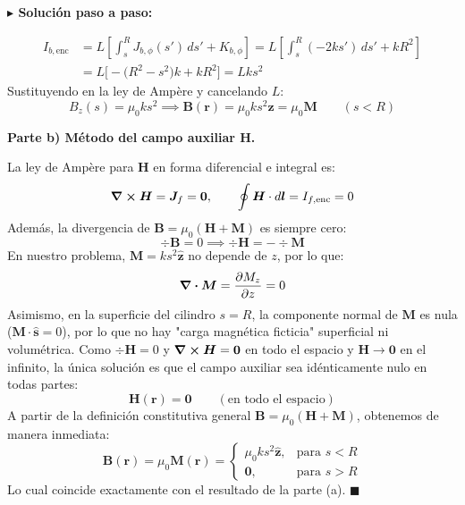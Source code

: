 \documentclass[11pt,a4paper]{book}
\newenvironment{solucion}{%
    \par\medskip\noindent\textbf{\color{blue!65!black}\Large $\blacktriangleright$ Solución paso a paso:}\par\medskip
}{%
    \hfill$\blacksquare$\par\bigskip
}
\newcommand{\shat}{\hat{\bm{s}}}
\newcommand{\zhat}{\hat{\bm{z}}}
\newcommand{\Bvec}{\bm{B}}
\newcommand{\Hvec}{\bm{H}}
\newcommand{\Mvec}{\bm{M}}
\newcommand{\Jvec}{\bm{J}}
\begin{document}
\begin{solucion}
\begin{align}
    I_{b,\text{enc}} &= L \left[ \int_{s}^{R} J_{b,\phi}(s')\,ds' + K_{b,\phi} \right] = L \left[ \int_{s}^{R} (-2k s')\,ds' + k R^2 \right] \nonumber \\
    &= L \Big[ -\big(R^2 - s^2\big)k + k R^2 \Big] = L k s^2
\end{align}
Sustituyendo en la ley de Ampère y cancelando $L$:
\begin{equation}
    B_z(s) = \mu_0 k s^2 \implies \Bvec(\bm{r}) = \mu_0 k s^2 \zhat = \mu_0 \Mvec \qquad (s < R)
\end{equation}

\medskip
\textbf{Parte b) Método del campo auxiliar $\Hvec$.}

La ley de Ampère para $\Hvec$ en forma diferencial e integral es:
\begin{equation}
    \curl{\Hvec} = \Jvec_f = \bm{0}, \qquad \oint \Hvec \cdot d\bm{l} = I_{f,\text{enc}} = 0
\end{equation}
Además, la divergencia de $\Bvec = \mu_0(\Hvec + \Mvec)$ es siempre cero:
\begin{equation}
    \div{\Bvec} = 0 \implies \div{\Hvec} = -\div{\Mvec}
\end{equation}
En nuestro problema, $\Mvec = k s^2 \zhat$ no depende de $z$, por lo que:
\begin{equation}
    \div{\Mvec} = \pdv{M_z}{z} = 0
\end{equation}
Asimismo, en la superficie del cilindro $s = R$, la componente normal de $\Mvec$ es nula ($\Mvec \cdot \shat = 0$), por lo que no hay "carga magnética ficticia" superficial ni volumétrica. Como $\div{\Hvec} = 0$ y $\curl{\Hvec} = \bm{0}$ en todo el espacio y $\Hvec \to \bm{0}$ en el infinito, la única solución es que el campo auxiliar sea idénticamente nulo en todas partes:
\begin{equation}
    \Hvec(\bm{r}) = \bm{0} \qquad (\text{en todo el espacio})
\end{equation}
A partir de la definición constitutiva general $\Bvec = \mu_0(\Hvec + \Mvec)$, obtenemos de manera inmediata:
\begin{equation}
    \Bvec(\bm{r}) = \mu_0 \Mvec(\bm{r}) = \begin{cases}
        \mu_0 k s^2 \zhat, & \text{para } s < R \\
        \bm{0}, & \text{para } s > R
    \end{cases}
\end{equation}
Lo cual coincide exactamente con el resultado de la parte (a).
\end{solucion}
\end{document}
